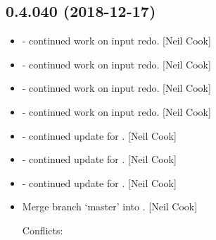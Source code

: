 \documentclass[a4paper,10pt,english]{report}
\begin{document}
\subsection{0.4.040 (2018-12-17)}
\label{\detokenize{misc/changelog:id228}}\begin{itemize}
\item {} 
 - continued work on input redo. {[}Neil Cook{]}

\item {} 
 - continued work on input redo. {[}Neil Cook{]}

\item {} 
 - continued work on input redo. {[}Neil Cook{]}

\item {} 
 - continued work on input redo. {[}Neil Cook{]}

\item {} 
 - continued update for . {[}Neil Cook{]}

\item {} 
 - continued update for . {[}Neil Cook{]}

\item {} 
 - continued update for . {[}Neil Cook{]}

\item {} 
Merge branch ‘master’ into . {[}Neil Cook{]}
\begin{description}
\item[{Conflicts:}] \leavevmode
{}

\end{description}

\end{itemize}
\end{document}
